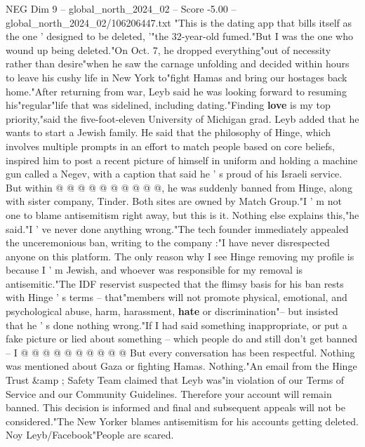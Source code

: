 \begin{textsample}{NEG Dim 9 – global\_north\_2024\_02 – Score -5.00 – global\_north\_2024\_02/106206447.txt}  \label{ex:f9_neg_287}
"This is the dating app that bills itself as the one ' designed to be deleted, '"the 32-year-old fumed."But I was the one who wound up being deleted."On Oct. 7, he dropped everything"out of necessity rather than desire"when he saw the carnage unfolding and decided within hours to leave his cushy life in New York to"fight Hamas and bring our hostages back home."After returning from war, Leyb said he was looking forward to resuming his"regular"life that was sidelined, including dating."Finding \textbf{love} is my top priority,"said the five-foot-eleven University of Michigan grad.
Leyb added that he wants to start a Jewish family.
He said that the philosophy of Hinge, which involves multiple prompts in an effort to match people based on core beliefs, inspired him to post a recent picture of himself in uniform and holding a machine gun called a Negev, with a caption that said he ' s proud of his Israeli service.
But within @ @ @ @ @ @ @ @ @ @, he was suddenly banned from Hinge, along with sister company, Tinder.
Both sites are owned by Match Group."I ' m not one to blame antisemitism right away, but this is it.
Nothing else explains this,"he said."I ' ve never done anything wrong."The tech founder immediately appealed the unceremonious ban, writing to the company :"I have never disrespected anyone on this platform.
The only reason why I see Hinge removing my profile is because I ' m Jewish, and whoever was responsible for my removal is antisemitic."The IDF reservist suspected that the flimsy basis for his ban rests with Hinge ' s terms -- that"members will not promote physical, emotional, and psychological abuse, harm, harassment, \textbf{hate} or discrimination"-- but insisted that he ' s done nothing wrong."If I had said something inappropriate, or put a fake picture or lied about something -- which people do and still don't get banned -- I @ @ @ @ @ @ @ @ @ @ But every conversation has been respectful.
Nothing was mentioned about Gaza or fighting Hamas.
Nothing."An email from the Hinge Trust \&amp ; Safety Team claimed that Leyb was"in violation of our Terms of Service and our Community Guidelines.
Therefore your account will remain banned.
This decision is informed and final and subsequent appeals will not be considered."The New Yorker blames antisemitism for his accounts getting deleted.
Noy Leyb/Facebook"People are scared.

\end{textsample}
